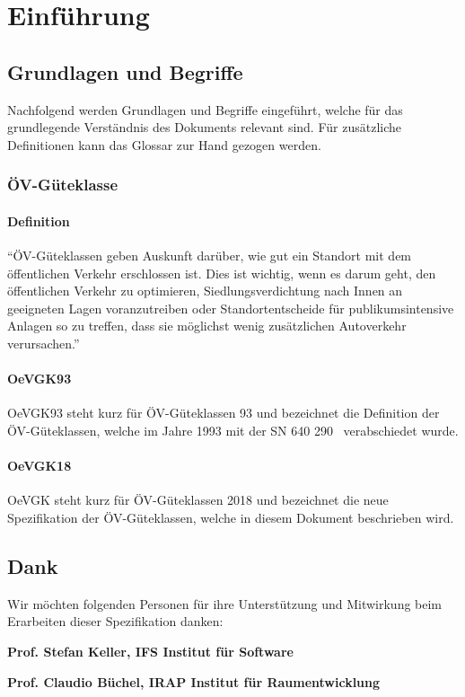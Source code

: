 \chapter{Einführung}
\label{Einführung}

\section{Grundlagen und Begriffe}
\label{Einführung:Grundlagen und Begriffe}

Nachfolgend werden Grundlagen und Begriffe eingeführt, welche für das grundlegende Verständnis des Dokuments relevant sind. Für zusätzliche Definitionen kann das Glossar zur Hand gezogen werden.

\subsection{ÖV-Güteklasse}
\label{Grundlagen und Begriffe:ÖV-Güteklasse}

\subsubsection{Definition}
"`\acs{ÖV}-Güteklassen geben Auskunft darüber, wie gut ein Standort mit dem öffentlichen Verkehr erschlossen ist.
Dies ist wichtig, wenn es darum geht, den öffentlichen Verkehr zu optimieren, Siedlungsverdichtung nach Innen an geeigneten Lagen voranzutreiben oder Standortentscheide für publikumsintensive Anlagen so zu treffen, dass sie möglichst wenig zusätzlichen Autoverkehr verursachen."'~\cite{oev-guteklasse-gr-defintion}

\subsubsection{OeVGK93}
OeVGK93 steht kurz für \acs{ÖV}-Güteklassen 93 und bezeichnet die Definition der \acs{ÖV}-Güteklassen, welche im Jahre 1993 mit der \acs{SN} 640 290~\cite{sn640290} verabschiedet wurde.

\subsubsection{OeVGK18}
OeVGK steht kurz für \acs{ÖV}-Güteklassen 2018 und bezeichnet die neue Spezifikation der \acs{ÖV}-Güteklassen, welche in diesem Dokument beschrieben wird.

\cleardoublepage
\section{Dank}
\label{Resultate:Dank}

Wir möchten folgenden Personen für ihre Unterstützung und Mitwirkung beim Erarbeiten dieser Spezifikation danken:

\textbf{Prof. Stefan Keller, IFS Institut für Software}

\textbf{Prof. Claudio Büchel, IRAP Institut für Raumentwicklung}